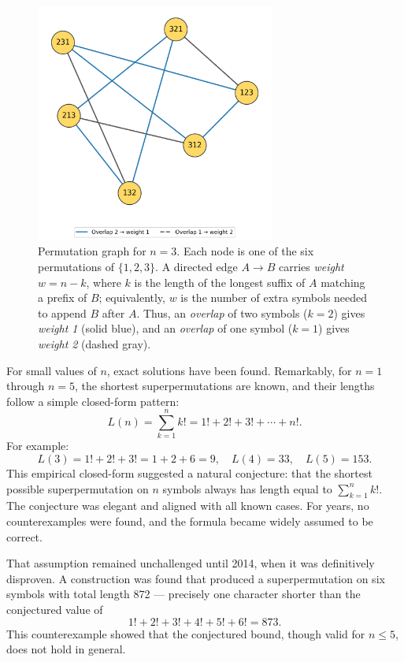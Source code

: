 \begin{figure}[ht]
  \centering
  \includegraphics[width=0.7\textwidth]{39_SuperpermutationsBreakthrough/permutation_graph_n3_spring.png}
  \caption{Permutation graph for $n=3$. Each node is one of the six permutations of $\{1,2,3\}$. A directed edge $A\to B$ carries \emph{weight} $w=n-k$, where $k$ is the length of the longest suffix of $A$ matching a prefix of $B$; equivalently, $w$ is the number of extra symbols needed to append $B$ after $A$. Thus, an \emph{overlap} of two symbols ($k=2$) gives \emph{weight 1} (solid blue), and an \emph{overlap} of one symbol ($k=1$) gives \emph{weight 2} (dashed gray).}
  \label{fig:permgraph3}
\end{figure}

For small values of $n$, exact solutions have been found. Remarkably, for $n = 1$ through $n = 5$, the shortest superpermutations are known, and their lengths follow a simple closed-form pattern:
\[
L(n) = \sum_{k=1}^n k! = 1! + 2! + 3! + \cdots + n!.
\]
For example:
\[
L(3) = 1! + 2! + 3! = 1 + 2 + 6 = 9, \quad
L(4) = 33, \quad
L(5) = 153.
\]
This empirical closed-form suggested a natural conjecture: that the shortest possible superpermutation on $n$ symbols always has length equal to $\sum_{k=1}^n k!$. The conjecture was elegant and aligned with all known cases. For years, no counterexamples were found, and the formula became widely assumed to be correct.

That assumption remained unchallenged until 2014, when it was definitively disproven. A construction was found that produced a superpermutation on six symbols with total length 872 — precisely one character shorter than the conjectured value of
\[
1! + 2! + 3! + 4! + 5! + 6! = 873.
\]
This counterexample showed that the conjectured bound, though valid for $n \leq 5$, does not hold in general.

